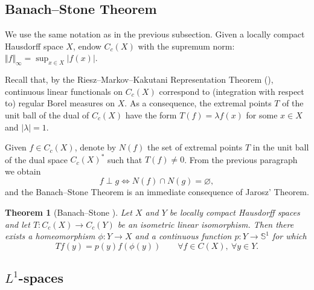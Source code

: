 \documentclass[letter,11pt]{amsart}
\theoremstyle{plain}		\newtheorem{theorem}[generalnumbering]{Theorem}
\theoremstyle{plain}		\newtheorem{corollary}[generalnumbering]{Corollary}
\theoremstyle{definition}		\newtheorem{definition}[generalnumbering]{Definition}
\theoremstyle{definition}		\newtheorem{example}[generalnumbering]{Example}
\theoremstyle{plain}		\newtheorem{proposition}[generalnumbering]{Proposition}
\theoremstyle{plain}		\newtheorem{lemma}[generalnumbering]{Lemma}
\theoremstyle{plain}    \newtheorem{plainstyle}[generalnumbering]{\namefordifferentenvironment}
\theoremstyle{plain}    \newtheorem*{plainstyle*}{\namefordifferentenvironment}
\theoremstyle{definition}    \newtheorem{definitionstyle}[generalnumbering]{\namefordifferentenvironment}
\theoremstyle{definition}    \newtheorem*{definitionstyle*}{\namefordifferentenvironment}
\begin{document}

\subsection{Banach--Stone Theorem}\label{subsectionbanachstone}

We use the same notation as in the previous subsection. Given a locally compact Hausdorff space $X$, endow $C_c(X)$ with the supremum norm: $\Vert f\Vert_\infty=\sup_{x\in X}|f(x)|$.

Recall that, by the Riesz--Markov--Kakutani Representation Theorem (\cite[Theorem 2.14]{MR584266}), continuous linear functionals on $C_c(X)$ correspond to (integration with respect to) regular Borel measures on $X$. As a consequence, the extremal points $T$ of the unit ball of the dual of $C_c(X)$ have the form $T(f)=\lambda f(x)$ for some $x\in X$ and $|\lambda|=1$.

Given $f\in C_c(X)$, denote by $N(f)$ the set of extremal points $T$ in the unit ball of the dual space $C_c(X)^*$ such that $T(f)\neq 0$. From the previous paragraph we obtain
\[f\perp g\iff N(f)\cap N(g)=\varnothing\tag{BS},\]
and the Banach--Stone Theorem is an immediate consequence of Jarosz' Theorem.

\begin{theorem}[Banach--Stone \cite{MR1501905}]\label{theorembanachstone}
	Let $X$ and $Y$ be locally compact Hausdorff spaces and let $T\colon C_c(X)\to C_c(Y)$ be an isometric linear isomorphism. Then there exists a homeomorphism $\phi\colon Y\to X$ and a continuous function $p\colon Y\to\mathbb{S}^1$ for which
	\[Tf(y)=p(y)f(\phi(y))\qquad\forall f\in C(X),\ \forall y\in Y.\]
\end{theorem}


\subsection{\texorpdfstring{$L^1$}{L¹}-spaces}\label{subsectionl1spaces}
\end{document}
